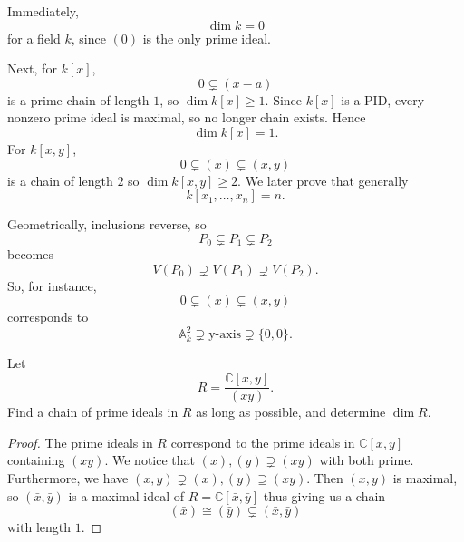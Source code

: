\documentclass[11pt]{article}
\begin{document}
Immediately, 
\[
    \dim k = 0
\]
for a field $k$, since $(0)$ is the only prime ideal.  

Next, for $k[x]$,
\[
    0 \subsetneq (x-a)
\]
is a prime chain of length $1$, so 
$\dim k[x] \geq 1$. Since $k[x]$ is a PID, every nonzero prime 
ideal is maximal, so no longer chain exists. Hence 
\[
    \dim k[x] = 1. 
\]
For $k[x,y]$, 
\[
    0 \subsetneq (x) \subsetneq (x,y)
\]
is a chain of length $2$ so $\dim k[x,y] \geq 2$. 
We later prove that generally 
\[
    k[x_1,\ldots,x_n] = n. 
\]

Geometrically, inclusions reverse, so 
\[
    P_0 \subsetneq P_1 \subsetneq P_2 
\]
becomes 
\[
    V(P_0) \supsetneq V(P_1) \supsetneq V(P_2). 
\]
So, for instance, 
\[
    0 \subsetneq (x) \subsetneq (x,y)
\]
corresponds to 
\[
    \mathbb A_k^2 \supsetneq \text{y-axis} \supsetneq 
    \{0,0\}. 
\]

\begin{prob}
    Let 
    \[
        R = \frac{\mathbb C[x,y]}{(xy)}. 
    \]
    Find a chain of prime ideals in $R$ as long as possible, 
    and determine $\dim R$. 
\end{prob}
\begin{proof}
    The prime ideals in $R$ correspond to the prime ideals 
    in $\mathbb C[x,y]$ containing $(xy)$. 
    We notice that $(x),(y) \supsetneq (xy)$ with both 
    prime. Furthermore, we have $(x,y) \supsetneq (x),(y) 
    \supseteq (xy)$.  
    Then $(x,y)$ is maximal, so 
    $(\bar x, \bar y)$ is a maximal ideal of 
    $R = \mathbb C[\bar x, \bar y]$ thus giving us a chain 
    \[
        (\bar x) \cong (\bar y) \subsetneq 
        (\bar x, \bar y)  
    \]
    with length $1$. 
\end{proof} 
\end{document}
